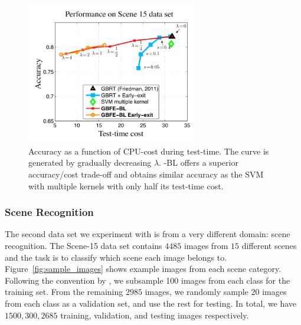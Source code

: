 \begin{figure}[t]
	\vspace{-1.5ex}
\centerline{
\includegraphics[width = 0.67\textwidth]{plots/scene15_noearly_depth4}
}
\vspace{-1.5ex}
\caption{Accuracy as a function of CPU-cost during test-time. The curve is generated by gradually decreasing $\lambda$. \name{}-BL offers a superior accuracy/cost trade-off and obtains similar accuracy as the SVM with multiple kernels with only half its test-time cost.  \label{fig:scene15}}
\end{figure}

\subsubsection{Scene Recognition} 
The second data set we experiment with is from a very different domain: scene recognition. The Scene-15 data set \citep{lazebnik2006beyond} contains $4485$ images from $15$ different scenes and the task is to classify which scene each image belongs to. Figure~\ref{fig:sample_images} shows example images from each scene category. Following the convention by \citet{lazebnik2006beyond,li2010object}, we subsample 100 images from each class for the training set. From the remaining $2985$ images, we randomly sample $20$ images from each class as a validation set, and use the rest for testing. In total, we have $1500, 300, 2685$ training, validation, and testing images respectively.


